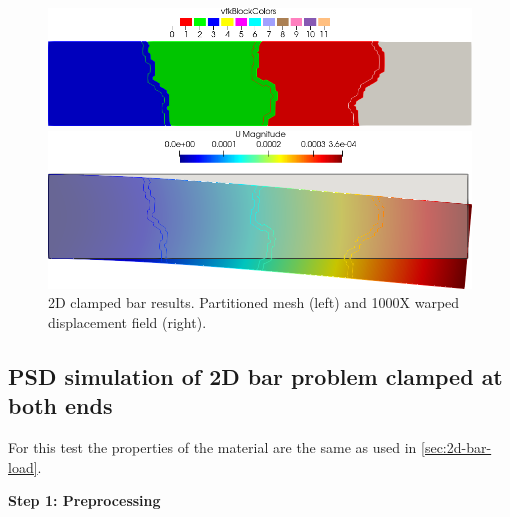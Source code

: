 \documentclass{report}
\begin{document}
\begin{figure}[htbp]
    \centering
    \begin{minipage}[t][2cm][t]{0.4\textwidth}
    \includegraphics[align=t,width=1\textwidth]{./Images/2d-bar-partioned.png}
    \end{minipage}\hspace{.1\textwidth}
    \begin{minipage}[t][2cm][t]{0.4\textwidth}
    \includegraphics[align=t,width=1\textwidth]{./Images/2d-bar-results.png}
    \end{minipage}
    \caption{2D clamped bar results. Partitioned mesh (left) and 1000X warped displacement field (right).}
    \label{fig:2d-bar-results}
\end{figure}


\subsection{PSD simulation of 2D bar problem clamped at both ends \label{sec:2D-bar-clamped1}}

For this test the properties of the material are the same as used in \cref{sec:2d-bar-load}. 

\textbf{Step 1: Preprocessing}
\end{document}
